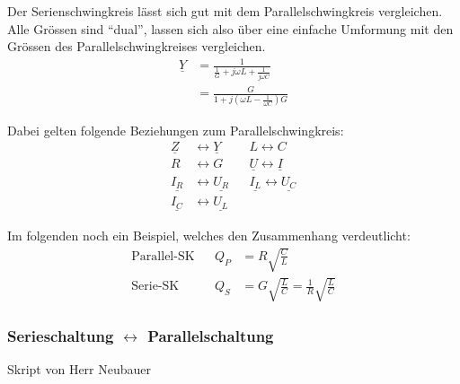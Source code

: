 Der Serienschwingkreis lässt sich gut mit dem Parallelschwingkreis vergleichen.
Alle Grössen sind "`dual"', lassen sich also über eine einfache Umformung mit
den Grössen des Parallelschwingkreises vergleichen.
\begin{align}
  \underline{Y} &= \frac{1}{\frac{1}{G}+j\omega L+\frac{1}{j\omega C}} \nonumber
  \\
  &= \frac{G}{1+j(\omega L-\frac{1}{\omega C})G} \nonumber
\end{align}

Dabei gelten folgende Beziehungen zum Parallelschwingkreis:
\begin{align}
\underline{Z} &\leftrightarrow \underline{Y} && L \leftrightarrow C\nonumber\\
R &\leftrightarrow G && \underline{U} \leftrightarrow \underline{I}\nonumber\\
\underline{I_R} &\leftrightarrow \underline{U_R} && \underline{I_L}
\leftrightarrow \underline{U_C}\nonumber\\
\underline{I_C} &\leftrightarrow \underline{U_L}\nonumber
\end{align}

Im folgenden noch ein Beispiel, welches den Zusammenhang verdeutlicht:
\begin{align}
\text{Parallel-SK} && Q_P&=R\sqrt{\frac{C}{L}}\nonumber\\
\text{Serie-SK} &&
Q_S&=G\sqrt{\frac{L}{C}}=\frac{1}{R}\sqrt{\frac{L}{C}}\nonumber
\end{align}

\subsubsection{Serieschaltung $\leftrightarrow$ Parallelschaltung}
Skript von Herr Neubauer